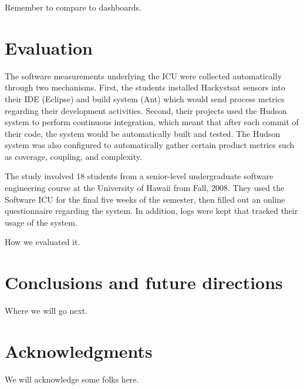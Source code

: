 \documentclass{acm_proc_article-sp}
\begin{document}
Remember to compare to dashboards. 

\section{Evaluation}
\label{sec:evaluation}

The software measurements underlying the ICU were collected automatically
through two mechanisms. First, the students installed Hackystsat sensors
into their IDE (Eclipse) and build system (Ant) which would send process
metrics regarding their development activities.  Second, their projects
used the Hudson system to perform continuous integration, which meant that
after each commit of their code, the system would be automatically built
and tested.  The Hudson system was also configured to automatically gather
certain product metrics such as coverage, coupling, and complexity.

The study involved 18 students from a senior-level undergraduate software
engineering course at the University of Hawaii from Fall, 2008.  They used
the Software ICU for the final five weeks of the semester, then filled out
an online questionnaire regarding the system.  In addition, logs were kept
that tracked their usage of the system.


How we evaluated it.

\section{Conclusions and future directions}
\label{sec:conclusions}

Where we will go next.

\section{Acknowledgments}

We will acknowledge some folks here.


  

\end{document}
